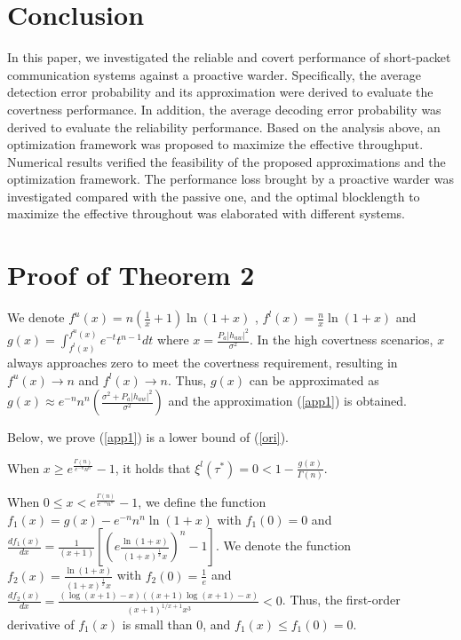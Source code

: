 \documentclass[conference]{IEEEtran}
\begin{document}
\section{Conclusion}
In this paper, we investigated the reliable and covert performance of short-packet communication systems against a proactive warder. Specifically, the average detection error probability and its approximation were derived to evaluate the covertness performance. In addition, the average decoding error probability was derived to evaluate the reliability performance. Based on the analysis above, an optimization framework was proposed to maximize the effective throughput. Numerical results verified the feasibility of the proposed approximations and the optimization framework. The performance loss brought by a proactive warder was investigated compared with the passive one, and the optimal blocklength to maximize the effective throughout was elaborated with different systems.


\appendices
\section{Proof of Theorem 2}\label{proof_theorem2}
We denote ${f^u}(x) \!=\! n\left( {\frac{1}{x} \!+\! 1} \right)\ln \left( {1 \!+\! x} \right)$ , ${f^l}(x) \!=\! {\frac{n}{x}\ln \left( {1 \!+\! x} \right)}$ and $g\left( x \right) = \int_{{f^l}\left( x \right)}^{{f^u}\left( x \right)} {{e^{ - t}}{t^{n - 1}}dt} $ where $x = \frac{{{P_a}{{\left| {{h_{aw}}} \right|}^2}}}{{\sigma^2}}$. In the high covertness scenarios, $x$ always approaches zero to meet the covertness requirement, resulting in ${f^u}(x) \to n$ and ${f^l}(x) \to n$. Thus, $g\left( x \right)$ can be approximated as $	g\left( x \right)  \approx {e^{ - n}}{n^n}\left( {\frac{{{\sigma ^2} + P_a{{\left| {{h_{aw}}} \right|}^2}}}{{{\sigma ^2}}}} \right)$
and the approximation (\ref{app1}) is obtained.

Below, we prove (\ref{app1}) is a lower bound of (\ref{ori}). 

When $x \ge {e^{\frac{{\Gamma \left( n \right)}}{{{e^{ - n}}{n^n}}}}} - 1$, it holds that ${\xi ^{l}(\tau^*)} = 0 < 1 - \frac{g\left( x \right)}{{\Gamma (n)}}$.

When $0 \le x < {e^{\frac{{\Gamma (n)}}{{{e^{ - n}}{n^n}}}}} - 1$, we define the function ${f_1}(x) = g\left( x \right)  - {e^{ - n}}{n^n}\ln \left( {1 + x} \right)$ with $f_1(0) = 0$ and $\frac{{d{f_1}(x)}}{{dx}} = \frac{1}{{(x + 1)}}\left[ {{{\left( {e\frac{{\ln \left( {1 + x} \right)}}{{{{(1 + x)}^{\frac{1}{x}}}x}}} \right)}^n} - 1} \right]$.
We denote the function $f_2(x) = \frac{{\ln \left( {1 + x} \right)}}{{{{(1 + x)}^{\frac{1}{x}}}x}}$ with $f_2(0) = \frac{1}{e}$ and $\frac{{d{f_2}\left( x \right)}}{{dx}} \!=\!   \frac{{(\log (x + 1)-x)((x + 1)\log (x + 1) - x)}}{{{{\left( {x + 1} \right)}^{1/x + 1}}{x^3}}} < 0$. Thus, the first-order derivative of $f_1(x)$ is small than 0, and $f_1(x) \le f_1(0) = 0$. 
\end{document}
